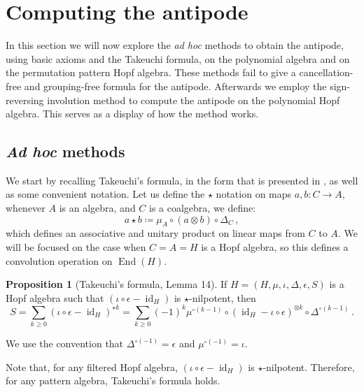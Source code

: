 \documentclass[12pt, reqno]{amsart}
\theoremstyle{definition}
\newtheorem{prop}[thm]{Proposition}
\DeclareMathOperator{\id}{id}
\DeclareMathOperator{\End}{\mathrm{End}}
\begin{document}
\section{Computing the antipode\label{sec:antipode_computing}}

In this section we will now explore the \textit{ad hoc} methods to obtain the antipode, using basic axioms and the Takeuchi formula, on the polynomial algebra and on the permutation pattern Hopf algebra.
These methods fail to give a cancellation-free and grouping-free formula for the antipode.
Afterwards we employ the sign-reversing involution method to compute the antipode on the polynomial Hopf algebra.
This serves as a display of how the method works.

\subsection{\textit{Ad hoc} methods}
We start by recalling Takeuchi's formula, in the form that is presented in \cite{GrinbergReiner}, as well as some convenient notation.
Let us define the $\star$ notation on maps $a, b: C \to A$, whenever $A$ is an algebra, and $C$ is a coalgebra, we define:
$$a \star b \coloneqq \mu_A \circ (a \otimes b) \circ \Delta_C\, ,$$
which defines an associative and unitary product on linear maps from $C$ to $A$. We will be focused on the case when $C=A=H$ is a Hopf algebra, so this defines a convolution operation on $\End(H)$.

\begin{prop}[Takeuchi's formula, Lemma 14]\label{lm:takeuchi}
If $H = (H, \mu, \iota, \Delta, \epsilon, S)$ is a Hopf algebra such that $(\iota\circ \epsilon - \id_H)$ is $\star$-nilpotent, then 
\begin{equation}\label{eq:eq1}
S = \sum_{k\geq 0 }  ( \iota  \circ\epsilon- \id_H)^{\star k} = \sum_{k\geq 0} (-1)^k \mu^{\circ (k-1)} \circ (\id_{H} - \iota \circ \epsilon)^{\otimes k} \circ \Delta^{\circ (k-1)}\, .
\end{equation}

We use the convention that $\Delta^{\circ (-1)} = \epsilon $ and $\mu^{\circ (-1)} = \iota$.
\end{prop}

Note that, for any filtered Hopf algebra, $( \iota \circ \epsilon - \id_H)$ is $\star$-nilpotent.
Therefore, for any pattern algebra, Takeuchi's formula holds.
\end{document}

